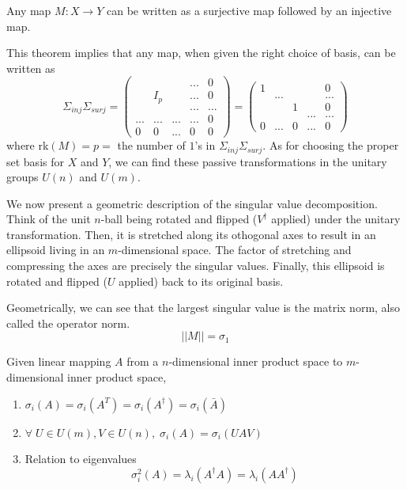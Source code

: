 \documentclass{article}
\begin{document}
    \begin{theorem}
    Any map $M: X \longrightarrow Y$ can be written as a surjective map followed by an injective map. 
    \end{theorem}

    This theorem implies that any map, when given the right choice of basis, can be written as 
    \[ \Sigma_{inj} \Sigma_{surj} = \begin{pmatrix}
    &&&...&0\\
    &I_p&&...&0\\
    &&&...&...\\
    ...&...&...&...&0\\
    0&0&...&0&0
    \end{pmatrix} = \begin{pmatrix}
    1&&&&0\\
    &...&&&...\\
    &&1&&0\\
    &&&...&...\\
    0&...&0&...&0
    \end{pmatrix}\]
    where rk$(M) = p = $ the number of $1$'s in $\Sigma_{inj} \Sigma_{surj}$. As for choosing the proper set basis for $X$ and $Y$, we can find these passive transformations in the unitary groups $U(n)$ and $U(m)$. 

    We now present a geometric description of the singular value decomposition. Think of the unit $n$-ball being rotated and flipped ($V^\dagger$ applied) under the unitary transformation. Then, it is stretched along its othogonal axes to result in an ellipsoid living in an $m$-dimensional space. The factor of stretching and compressing the axes are precisely the singular values. Finally, this ellipsoid is rotated and flipped ($U$ applied) back to its original basis. 

    \begin{theorem}
    Geometrically, we can see that the largest singular value is the matrix norm, also called the operator norm. 
    \[||M|| = \sigma_1\]
    \end{theorem}

    \begin{theorem} Given linear mapping $A$ from a $n$-dimensional inner product space to $m$-dimensional inner product space, 
    \begin{enumerate}
        \item $\sigma_i(A) = \sigma_i (A^T) = \sigma_i (A^\dagger) = \sigma_i (\bar{A})$
        \item $\forall \; U \in U(m), V \in U(n), \; \sigma_i (A) = \sigma_i (U A V)$
        \item Relation to eigenvalues
    \[\sigma_i^2(A) = \lambda_i (A^\dagger A) = \lambda_i (A A^\dagger)\]
    \end{enumerate}
    \end{theorem}
\end{document}
